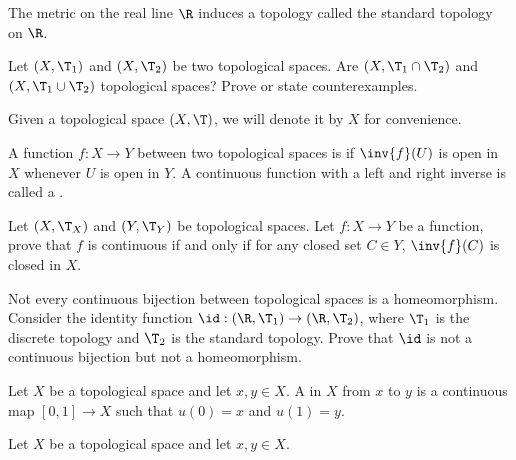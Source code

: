 \documentclass[10pt]{article}
\begin{document}
\par
The metric on the real line $\R$ induces a topology called the standard topology on $\R$.
\begin{problem}
    Let $(X,{\T}_{1})$ and $(X,{\T}_{2})$ be two topological spaces. Are $(X,{\T}_{1}\cap{\T}_{2})$ and $(X,{\T}_{1}\cup{\T}_{2})$ topological spaces? Prove or state counterexamples.
\end{problem}
\begin{remark}
    Given a topological space $(X,\T)$, we will denote it by $X$ for convenience.
\end{remark}
\begin{definition}
    A function $f:X\to Y$ between two topological spaces is  if $\inv{f}(U)$ is open in $X$ whenever $U$ is open in $Y$. A continuous function with a left and right inverse is called a .
\end{definition}
\begin{problem}
    Let $(X,{\T}_{X})$ and $(Y,{\T}_{Y})$ be topological spaces. Let $f:X\to Y$ be a function, prove that $f$ is continuous if and only if for any closed set $C\in Y$, $\inv{f}(C)$ is closed in $X$.
\end{problem}
\begin{problem}
    Not every continuous bijection between topological spaces is a homeomorphism. Consider the identity function $\id:(\R,{\T}_{1})\to(\R,{\T}_{2})$, where ${\T}_{1}$ is the discrete topology and ${\T}_{2}$ is the standard topology. Prove that $\id$ is not a continuous bijection but not a homeomorphism.
\end{problem}
\begin{definition}
    Let $X$ be a topological space and let $x,y\in X$. A  in $X$ from $x$ to $y$ is a continuous map $[0,1]\to X$ such that $u(0)=x$ and $u(1)=y$.
\end{definition}
\par
Let $X$ be a topological space and let $x,y\in X$. 
\end{document}

